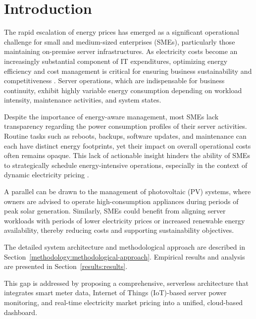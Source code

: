
\section{Introduction}
\label{introduction:introduction}
The rapid escalation of energy prices has emerged as a significant operational challenge for small and medium-sized enterprises (SMEs), particularly those maintaining on-premise server infrastructures. As electricity costs become an increasingly substantial component of IT expenditures, optimizing energy efficiency and cost management is critical for ensuring business sustainability and competitiveness \cite{ec2022energyefficiencysmes}. Server operations, which are indispensable for business continuity, exhibit highly variable energy consumption depending on workload intensity, maintenance activities, and system states.

Despite the importance of energy-aware management, most SMEs lack transparency regarding the power consumption profiles of their server activities. Routine tasks such as reboots, backups, software updates, and maintenance can each have distinct energy footprints, yet their impact on overall operational costs often remains opaque. This lack of actionable insight hinders the ability of SMEs to strategically schedule energy-intensive operations, especially in the context of dynamic electricity pricing \cite{ristic2021iotenergymanagement}.

A parallel can be drawn to the management of photovoltaic (PV) systems, where owners are advised to operate high-consumption appliances during periods of peak solar generation. Similarly, SMEs could benefit from aligning server workloads with periods of lower electricity prices or increased renewable energy availability, thereby reducing costs and supporting sustainability objectives.

The detailed system architecture and methodological approach are described in Section~\ref{methodology:methodological-approach}. Empirical results and analysis are presented in Section~\ref{results:results}.

This gap is addressed by proposing a comprehensive, serverless architecture that integrates smart meter data, Internet of Things (IoT)-based server power monitoring, and real-time electricity market pricing into a unified, cloud-based dashboard.

